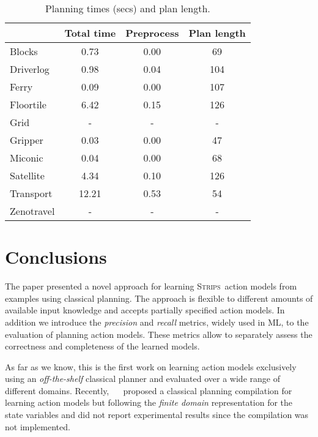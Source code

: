 \documentclass[letterpaper]{article} %
\newcommand{\strips}{\textsc{Strips}}     %
\begin{document}
\begin{table}
\begin{footnotesize}
	\begin{center}
		\begin{tabular}{l|c|c|c|}			
			 & Total time & Preprocess & Plan length  \\
			\hline
            Blocks & 0.73 & 0.00 & 69  \\
            Driverlog & 0.98 & 0.04 & 104 \\
            Ferry & 0.09 & 0.00 & 107 \\
            Floortile & 6.42 & 0.15 & 126 \\
            Grid & - & - & - \\            
            Gripper & 0.03 & 0.00 & 47 \\
            Miconic & 0.04 & 0.00 & 68 \\
            Satellite & 4.34 & 0.10 & 126 \\
            Transport & 12.21 & 0.53 & 54 \\			
            Zenotravel & - & - & - \\
		\end{tabular}
	\end{center}
        \end{footnotesize}
	\caption{\small Planning times (secs) and plan length.}
	\label{tab:time_states}	
\end{table}


\section{Conclusions}
The paper presented a novel approach for learning \strips\ action models from examples using classical planning. The approach is flexible to different amounts of available input knowledge and accepts partially specified action models. In addition we introduce the {\em precision} and {\em recall} metrics, widely used in ML, to the evaluation of planning action models. These metrics allow to separately assess the correctness and completeness of the learned models. 

As far as we know, this is the first work on learning action models exclusively using an {\em off-the-shelf} classical planner and evaluated over a wide range of different domains. Recently, ~\citeauthor{stern2017efficient}~\citeyear{stern2017efficient} proposed a classical planning compilation for learning action models but following the {\em finite domain} representation for the state variables and did not report experimental results since the compilation was not implemented. 
\end{document}
